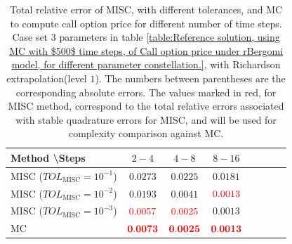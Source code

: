 \begin{table}[h!]
	\centering
	\begin{tabular}{l*{6}{c}r}
		Method \textbackslash  Steps           & $2-4$ & $4-8$ & $8-16$  \\
		\hline
		MISC ($TOL_{\text{MISC}}=10^{-1}$)  &$0.0273$  &$0.0225$ & $0.0181$  \\
			MISC ($TOL_{\text{MISC}}=10^{-2}$)  & $0.0193$  & $0.0041$ & ${\color{red}0.0013}$  \\
		MISC ($TOL_{\text{MISC}}=10^{-3}$)  & ${\color{red}0.0057}$  & ${\color{red}0.0025}$ & $0.0013$  \\
	\hline

		MC    & ${\color{red}\mathbf{0.0073}}$  &   ${\color{red}\mathbf{0.0025}}$  &  ${\color{red}\mathbf{0.0013}}$  \\
		\hline
	\end{tabular}
	\caption{Total relative error of MISC, with different tolerances, and MC to compute call option price  for different number of time steps. Case set $3$ parameters in table \ref{table:Reference solution, using MC with $500$ time steps, of Call option price under rBergomi model, for different parameter constellation.}, with Richardson extrapolation(level $1$). The numbers between parentheses are the corresponding absolute errors. The values marked in red, for MISC method, correspond to the total relative errors associated with  stable quadrature errors for MISC, and will be used for complexity comparison against MC.}
	\label{Total  error of MISC and MC to compute Call option price of the different tolerances for different number of time steps. Case set $3$ parameters, with Richardson extrapolation(level $1$). The numbers between parentheses are the corresponding absolute errors.}
\end{table}

\FloatBarrier

